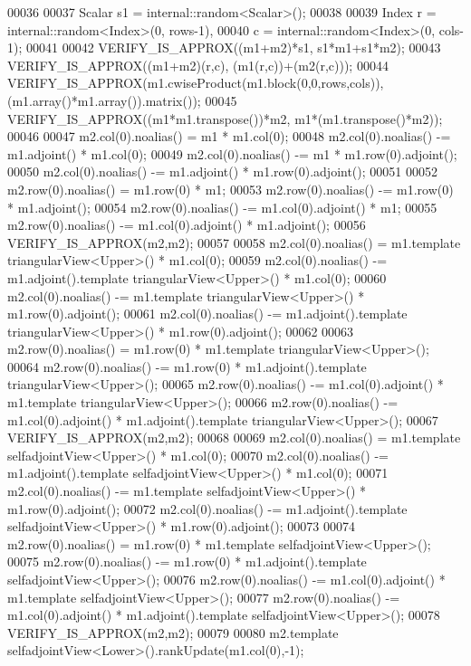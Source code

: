 \begin{DoxyCode}
00036 
00037   Scalar s1 = internal::random<Scalar>();
00038 
00039   Index r = internal::random<Index>(0, rows-1),
00040         c = internal::random<Index>(0, cols-1);
00041 
00042   VERIFY\_IS\_APPROX((m1+m2)*s1,              s1*m1+s1*m2);
00043   VERIFY\_IS\_APPROX((m1+m2)(r,c), (m1(r,c))+(m2(r,c)));
00044   VERIFY\_IS\_APPROX(m1.cwiseProduct(m1.block(0,0,rows,cols)), (m1.array()*m1.array()).matrix());
00045   VERIFY\_IS\_APPROX((m1*m1.transpose())*m2,  m1*(m1.transpose()*m2));
00046   
00047   m2.col(0).noalias() = m1 * m1.col(0);
00048   m2.col(0).noalias() -= m1.adjoint() * m1.col(0);
00049   m2.col(0).noalias() -= m1 * m1.row(0).adjoint();
00050   m2.col(0).noalias() -= m1.adjoint() * m1.row(0).adjoint();
00051 
00052   m2.row(0).noalias() = m1.row(0) * m1;
00053   m2.row(0).noalias() -= m1.row(0) * m1.adjoint();
00054   m2.row(0).noalias() -= m1.col(0).adjoint() * m1;
00055   m2.row(0).noalias() -= m1.col(0).adjoint() * m1.adjoint();
00056   VERIFY\_IS\_APPROX(m2,m2);
00057   
00058   m2.col(0).noalias() = m1.template triangularView<Upper>() * m1.col(0);
00059   m2.col(0).noalias() -= m1.adjoint().template triangularView<Upper>() * m1.col(0);
00060   m2.col(0).noalias() -= m1.template triangularView<Upper>() * m1.row(0).adjoint();
00061   m2.col(0).noalias() -= m1.adjoint().template triangularView<Upper>() * m1.row(0).adjoint();
00062 
00063   m2.row(0).noalias() = m1.row(0) * m1.template triangularView<Upper>();
00064   m2.row(0).noalias() -= m1.row(0) * m1.adjoint().template triangularView<Upper>();
00065   m2.row(0).noalias() -= m1.col(0).adjoint() * m1.template triangularView<Upper>();
00066   m2.row(0).noalias() -= m1.col(0).adjoint() * m1.adjoint().template triangularView<Upper>();
00067   VERIFY\_IS\_APPROX(m2,m2);
00068   
00069   m2.col(0).noalias() = m1.template selfadjointView<Upper>() * m1.col(0);
00070   m2.col(0).noalias() -= m1.adjoint().template selfadjointView<Upper>() * m1.col(0);
00071   m2.col(0).noalias() -= m1.template selfadjointView<Upper>() * m1.row(0).adjoint();
00072   m2.col(0).noalias() -= m1.adjoint().template selfadjointView<Upper>() * m1.row(0).adjoint();
00073 
00074   m2.row(0).noalias() = m1.row(0) * m1.template selfadjointView<Upper>();
00075   m2.row(0).noalias() -= m1.row(0) * m1.adjoint().template selfadjointView<Upper>();
00076   m2.row(0).noalias() -= m1.col(0).adjoint() * m1.template selfadjointView<Upper>();
00077   m2.row(0).noalias() -= m1.col(0).adjoint() * m1.adjoint().template selfadjointView<Upper>();
00078   VERIFY\_IS\_APPROX(m2,m2);
00079   
00080   m2.template selfadjointView<Lower>().rankUpdate(m1.col(0),-1);

\end{DoxyCode}
